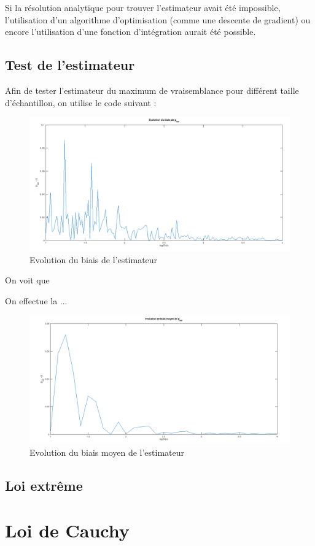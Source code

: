 \documentclass[12pt,a4paper,titlepage]{article}
\begin{document}
Si la résolution analytique pour trouver l'estimateur avait été impossible,
l'utilisation d'un algorithme d'optimisation (comme une descente de gradient) ou encore
l'utilisation d'une fonction d'intégration aurait été possible.

\subsection{Test de l'estimateur}

Afin de tester l'estimateur du maximum de vraisemblance pour différent taille
d'échantillon, on utilise le code suivant :



\begin{figure}[!h]
\begin{center}
 \includegraphics[scale=0.3]{images/biaisGeom.png} 
\end{center}
 \caption{Evolution du biais de l'estimateur}
 \label{Evolution du biais de l'estimateur geom}
\end{figure}

On voit que

On effectue la ...



\begin{figure}[!h]
\begin{center}
 \includegraphics[scale=0.3]{images/biaisMoyGeom.png} 
\end{center}
 \caption{Evolution du biais moyen de l'estimateur}
 \label{Evolution du biais moyen de l'estimateur geom}
\end{figure}

\subsection{Loi extrême}



\section{Loi de Cauchy}
\end{document}
